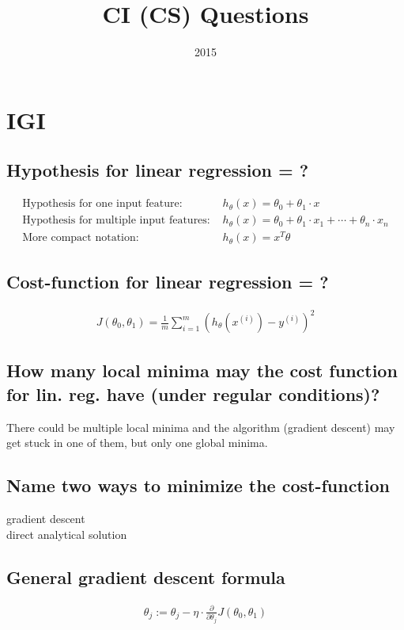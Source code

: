 \documentclass[12pt]{scrartcl}
\title{CI (CS) Questions}
\date{2015}
\begin{document}
\pagestyle{igi-style}

\section{IGI}

\subsection{Hypothesis for linear regression = ?}

\begin{align*}
\text{Hypothesis for one input feature: } & h_\theta(x)=\theta_0+\theta_1 \cdot x \\
\text{Hypothesis for multiple input features: } & h_\theta(x)=\theta_0+\theta_1 \cdot x_1 + \cdots + \theta_n \cdot x_n \\
\text{More compact notation: } & h_\theta(x)=x^T\theta
\end{align*}

\subsection{Cost-function for linear regression = ?}
\begin{align*}
J(\theta_0,\theta_1)= \frac{1}{m} \sum_{i=1}^{m}(h_\theta(x^{(i)})-y^{(i)})^2
\end{align*}

\subsection{How many local minima may the cost function for lin. reg. have (under regular conditions)? }
There could be multiple local minima and the algorithm (gradient descent) may get stuck in one of them, but only one global minima.

\subsection{Name two ways to minimize the cost-function}
gradient descent \\
direct analytical solution

\subsection{General gradient descent formula}
\begin{align*}
\theta_j:=\theta_j - \eta \cdot \frac{\partial}{\partial\theta_j} J(\theta_0,\theta_1)
\end{align*}
\end{document}
